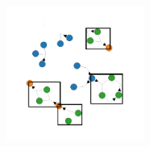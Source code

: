     \begin{figure}[H]
        \centering
        \includegraphics[width=0.4\textwidth]{diagrams/all-diagrams-r4.png}
    \end{figure}
